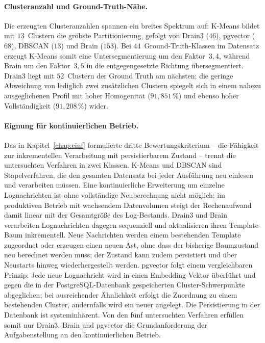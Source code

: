\paragraph{Clusteranzahl und Ground-Truth-Nähe.}
Die erzeugten Clusteranzahlen spannen ein breites Spektrum auf: K-Means bildet mit $13$~Clustern die gröbste Partitionierung, gefolgt von Drain3 ($46$), pgvector ($68$), DBSCAN ($13$) und Brain ($153$). Bei $44$~Ground-Truth-Klassen im Datensatz erzeugt K-Means somit eine Untersegmentierung um den Faktor~$3{,}4$, während Brain um den Faktor~$3{,}5$ in die entgegengesetzte Richtung übersegmentiert. Drain3 liegt mit $52$~Clustern der Ground Truth am nächsten; die geringe Abweichung von lediglich zwei zusätzlichen Clustern spiegelt sich in einem nahezu ausgeglichenen Profil mit hoher Homogenität ($91{,}851\,\%$) und ebenso hoher Vollständigkeit ($91{,}208\,\%$) wider.

\paragraph{Eignung für kontinuierlichen Betrieb.}
Das in Kapitel~\ref{chap:einf} formulierte dritte Bewertungskriterium -- die Fähigkeit zur inkrementellen Verarbeitung mit persistierbarem Zustand -- trennt die untersuchten Verfahren in zwei Klassen. K-Means und DBSCAN sind Stapelverfahren, die den gesamten Datensatz bei jeder Ausführung neu einlesen und verarbeiten müssen. Eine kontinuierliche Erweiterung um einzelne Lognachrichten ist ohne vollständige Neuberechnung nicht möglich; im produktiven Betrieb mit wachsendem Datenvolumen steigt der Rechenaufwand damit linear mit der Gesamtgröße des Log-Bestands. Drain3 und Brain verarbeiten Lognachrichten dagegen sequenziell und aktualisieren ihren Template-Baum inkrementell. Neue Nachrichten werden einem bestehenden Template zugeordnet oder erzeugen einen neuen Ast, ohne dass der bisherige Baumzustand neu berechnet werden muss; der Zustand kann zudem persistiert und über Neustarts hinweg wiederhergestellt werden. pgvector folgt einem vergleichbaren Prinzip: Jede neue Lognachricht wird in einen Embedding-Vektor überführt und gegen die in der PostgreSQL-Datenbank gespeicherten Cluster-Schwerpunkte abgeglichen; bei ausreichender Ähnlichkeit erfolgt die Zuordnung zu einem bestehenden Cluster, andernfalls wird ein neuer angelegt. Die Persistierung in der Datenbank ist systeminhärent. Von den fünf untersuchten Verfahren erfüllen somit nur Drain3, Brain und pgvector die Grundanforderung der Aufgabenstellung an den kontinuierlichen Betrieb.

